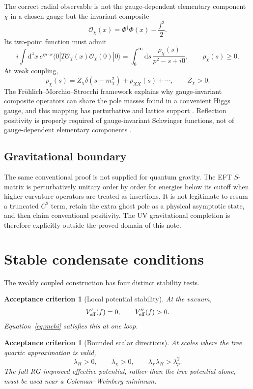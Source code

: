 \documentclass[11pt,a4paper]{article}
\newtheorem{criterion}[definition]{Acceptance criterion}
\newcommand{\dd}{\mathrm{d}}
\begin{document}
The correct radial observable is not the gauge-dependent elementary component $\chi$ in a chosen gauge but the invariant composite
\begin{equation}
\mathcal O_\chi(x)=\Phi^\dagger\Phi(x)-\frac{f^2}{2}.
\label{eq:Ochi}
\end{equation}
Its two-point function must admit
\begin{equation}
 i\int\dd^4x\,e^{ip\cdot x}
\langle0|T\mathcal O_\chi(x)\mathcal O_\chi(0)|0\rangle
=
\int_0^\infty\dd s\,
\frac{\rho_\chi(s)}{p^2-s+i0},
\qquad
\rho_\chi(s)\ge0.
\label{eq:KL}
\end{equation}
At weak coupling,
\[
\rho_\chi(s)=Z_\chi\delta(s-m_\chi^2)+\rho_{XX}(s)+\cdots,
\qquad Z_\chi>0.
\]
The Fr\"ohlich--Morchio--Strocchi framework explains why gauge-invariant composite operators can share the pole masses found in a convenient Higgs gauge, and this mapping has perturbative and lattice support \cite{Maas2024}. Reflection positivity is properly required of gauge-invariant Schwinger functions, not of gauge-dependent elementary components \cite{Hayashi2021}.

\subsection{Gravitational boundary}

The same conventional proof is not supplied for quantum gravity. The EFT $S$-matrix is perturbatively unitary order by order for energies below its cutoff when higher-curvature operators are treated as insertions. It is not legitimate to resum a truncated $C^2$ term, retain the extra ghost pole as a physical asymptotic state, and then claim conventional positivity. The UV gravitational completion is therefore explicitly outside the proved domain of this note.

\section{Stable condensate conditions}

The weakly coupled construction has four distinct stability tests.

\begin{criterion}[Local potential stability]
At the vacuum,
\[
V_{\rm eff}'(f)=0,
\qquad
V_{\rm eff}''(f)>0.
\]
Equation~\eqref{eq:mchi} satisfies this at one loop.
\end{criterion}

\begin{criterion}[Bounded scalar directions]
At scales where the tree quartic approximation is valid,
\begin{equation}
\lambda_H>0,
\qquad
\lambda_\chi>0,
\qquad
\lambda_\chi\lambda_H>\lambda_p^2.
\label{eq:bounded}
\end{equation}
The full RG-improved effective potential, rather than the tree potential alone, must be used near a Coleman--Weinberg minimum.
\end{criterion}
\end{document}
